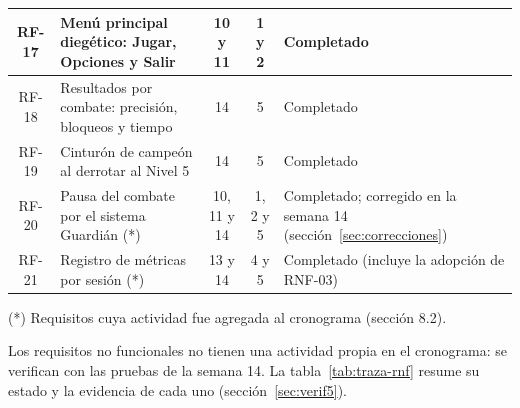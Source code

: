 \begin{table}[H]
\begin{tabularx}{\linewidth}{|c|L|c|c|>{\raggedright\arraybackslash}p{3.1cm}|}
RF-17 & Menú principal diegético: Jugar, Opciones y Salir & 10 y 11 & 1 y 2 & Completado\\ \hline
RF-18 & Resultados por combate: precisión, bloqueos y tiempo & 14 & 5 & Completado\\ \hline
RF-19 & Cinturón de campeón al derrotar al Nivel 5 & 14 & 5 & Completado\\ \hline
RF-20 & Pausa del combate por el sistema Guardián (*) & 10, 11 y 14 & 1, 2 y 5 & Completado; corregido en la semana 14 (sección~\ref{sec:correcciones})\\ \hline
RF-21 & Registro de métricas por sesión (*) & 13 y 14 & 4 y 5 & Completado (incluye la adopción de RNF-03)\\ \hline
\end{tabularx}
\end{table}
{\small (*) Requisitos cuya actividad fue agregada al cronograma (sección 8.2).}

Los requisitos no funcionales no tienen una actividad propia en el cronograma: se verifican con las pruebas de la semana 14. La tabla~\ref{tab:traza-rnf} resume su estado y la evidencia de cada uno (sección~\ref{sec:verif5}).

